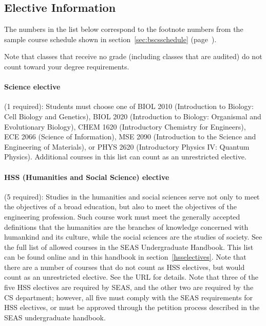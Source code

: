 \subsection{Elective Information}
\label{sec:electiveinfo}

The numbers in the list below correspond to the footnote numbers from
the sample course schedule shown in section~\ref{sec:bscsschedule}
(page~\pageref{sec:bscsschedule}).

Note that classes that receive no grade (including classes that are
audited) do not count toward your degree requirements.

\paragraph{Science elective} (1 required): Students must choose one of 
  BIOL 2010 (Introduction to Biology: Cell Biology and Genetics),
  BIOL 2020 (Introduction to Biology: Organismal and Evolutionary Biology), 
  CHEM 1620 (Introductory Chemistry for Engineers), 
  ECE 2066 (Science of Information), 
  MSE 2090 (Introduction to the Science and Engineering of Materials), 
  or
  PHYS 2620 (Introductory Physics IV: Quantum Physics).
  Additional courses in this list can count as an unrestricted
  elective.

\paragraph{HSS (Humanities and Social Science) elective} (5 required): 
  Studies in the humanities and social sciences serve not only to meet
  the objectives of a broad education, but also to meet the objectives
  of the engineering profession. Such course work must meet the
  generally accepted definitions that the humanities are the branches
  of knowledge concerned with humankind and its culture, while the
  social sciences are the studies of society. See the full list of
  allowed courses in the SEAS Undergraduate Handbook. This list can be
  found
  online
  and in this handbook in section~\ref{hsselectives}. Note that there
  are a number of courses that do not count as HSS electives, but
  would count as an unrestricted elective. See the URL for details.
  Note that three of the five HSS electives are required by SEAS, and
  the other two are required by the CS department; however, all five
  must comply with the SEAS requirements for HSS electives, or must be
  approved through the petition process described in the SEAS
  undergraduate handbook.

